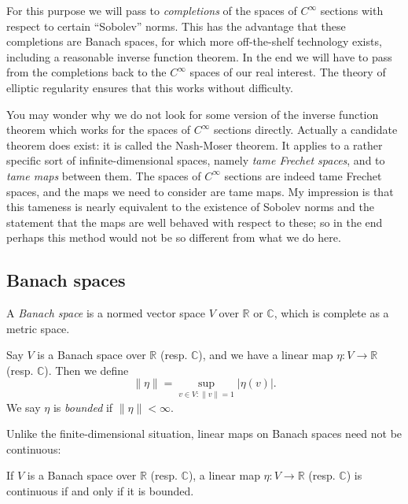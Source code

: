 \documentclass[12pt,letterpaper,reqno]{article}
\numberwithin{equation}{section}
\newcommand{\R}{\ensuremath{\mathbb R}}
\newcommand{\C}{\ensuremath{\mathbb C}}
\newcommand{\abs}[1]{\lvert#1\rvert}
\newcommand{\norm}[1]{\lVert#1\rVert}
\newcommand{\ti}[1]{\textit{#1}}
\begin{document}
For this purpose we will pass to \ti{completions}
of the spaces of $C^\infty$ sections with
respect to certain ``Sobolev'' norms.
This has the advantage that these completions are Banach spaces, for which
more off-the-shelf technology exists, including a
reasonable inverse function theorem. In the end we will have to
pass from the completions back to the $C^\infty$ spaces of
our real interest. The theory of elliptic regularity ensures
that this works without difficulty.

You may wonder why we do not look for some version
of the inverse function theorem which works for the spaces of
$C^\infty$ sections directly. Actually a candidate theorem
does exist: it is called the Nash-Moser theorem. It applies
to a rather specific sort of infinite-dimensional spaces,
namely \ti{tame Frechet spaces}, and to \ti{tame maps} between them.
The spaces of $C^\infty$ sections are indeed tame Frechet spaces,
and the maps we need to consider are tame maps.
My impression is that this tameness is nearly equivalent to
the existence of Sobolev norms and the statement that the maps
are well behaved with respect to these; so in the end perhaps
this method would not be so different from what we do here.


\subsection{Banach spaces}

\begin{defn} A \ti{Banach space} is
a normed vector space $V$ over $\R$ or $\C$, which
is complete as a metric space.
\end{defn}

\begin{defn} Say $V$ is a Banach
space over $\R$ (resp. $\C$), and we have a
linear map $\eta: V \to \R$ (resp. $\C$). Then we define
\begin{equation}
  \norm{\eta} = \sup_{v \in V: \norm{v}=1} \abs{\eta(v)}.
\end{equation}
We say $\eta$ is \ti{bounded} if $\norm{\eta} < \infty$.
\end{defn}

Unlike the finite-dimensional situation, linear maps
on Banach spaces need not be continuous:

\begin{prop}[Continuous = bounded] If $V$ is a Banach space
over $\R$ (resp. $\C$), a linear map $\eta: V \to \R$
(resp. $\C$) is continuous if and only if it is bounded.
\end{prop}
\end{document}
